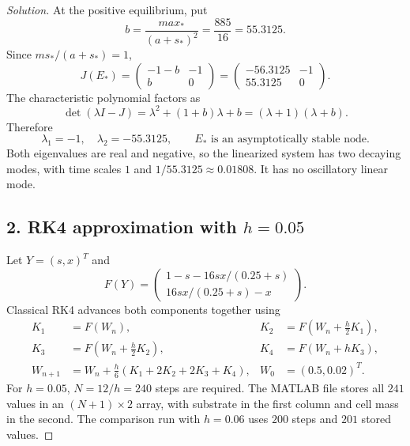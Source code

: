 \documentclass[12pt]{amsart}
\newenvironment{solution}
{\begin{proof}[Solution]}
{\end{proof}}
\begin{document}
\begin{onehalfspace}
\begin{solution}
            At the positive equilibrium, put
            \[
                b=\frac{ma x_*}{(a+s_*)^2}=\frac{885}{16}=55.3125.
            \]
            Since $ms_* /(a+s_*)=1$,
            \[
                J(E_*)=\begin{pmatrix}-1-b&-1\\b&0\end{pmatrix}
                =\begin{pmatrix}-56.3125&-1\\55.3125&0\end{pmatrix}.
            \]
            The characteristic polynomial factors as
            \[
                \det(\lambda I-J) = \lambda^2+(1+b)\lambda+b
                =(\lambda+1)(\lambda+b).
            \]
            Therefore
            \[
                \boxed{\lambda_1=-1,\quad \lambda_2=-55.3125,
                    \qquad E_*\text{ is an asymptotically stable node.}}
            \]
            Both eigenvalues are real and negative, so the linearized system has
            two decaying modes, with time scales $1$ and $1/55.3125\approx0.01808$.
            It has no oscillatory linear mode.

            \subsection*{2. RK4 approximation with $h=0.05$}
            Let $Y=(s,x)^T$ and
            \[
                F(Y)=\begin{pmatrix}1-s-16sx/(0.25+s)\\16sx/(0.25+s)-x\end{pmatrix}.
            \]
            Classical RK4 advances both components together using
            \begin{align*}
                K_1&=F(W_n),& K_2&=F(W_n+\tfrac h2K_1),\\
                K_3&=F(W_n+\tfrac h2K_2),& K_4&=F(W_n+hK_3),\\
                W_{n+1}&=W_n+\frac h6(K_1+2K_2+2K_3+K_4),
                &W_0&=(0.5,0.02)^T.
            \end{align*}
            For $h=0.05$, $N=12/h=240$ steps are required. The MATLAB file stores
            all $241$ values in an $(N+1)\times2$ array, with substrate in the first
            column and cell mass in the second. The comparison run with $h=0.06$
            uses $200$ steps and $201$ stored values.


\end{solution}
\end{onehalfspace}
\end{document}
